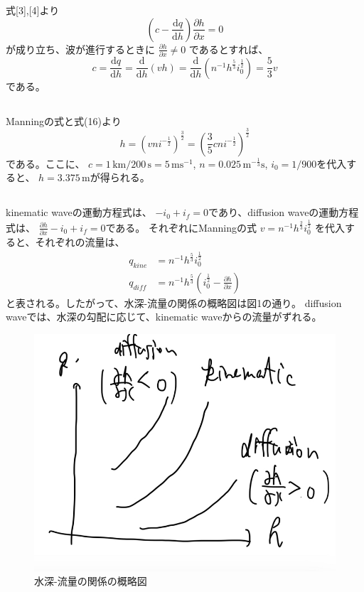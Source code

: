 \documentclass[a4paper]{jsarticle}
\begin{document}
\subsection{}
式[3],[4]より
\begin{equation}
  \left(c - \frac{\mathrm{d} q}{\mathrm{d} h}\right)
  \frac{\partial h}{\partial x} = 0
\end{equation}
が成り立ち、波が進行するときに
$\frac{\partial h}{\partial x} \neq 0$
であるとすれば、
\begin{equation}
  c = \frac{\mathrm{d} q}{\mathrm{d} h}
  = \frac{\mathrm{d}}{\mathrm{d} h} (v h)
  = \frac{\mathrm{d}}{\mathrm{d} h} \left(n^{-1} h^{\frac{5}{3}} i_0^{\frac{1}{2}}\right)
  = \frac{5}{3} v
\end{equation}
である。

\subsection{}
Manningの式と式(16)より
\begin{equation}
  h = \left(v n i^{-\frac{1}{2}}\right)^{\frac{3}{2}}
  = \left(\frac{3}{5} c n i^{-\frac{1}{2}}\right)^{\frac{3}{2}}
\end{equation}
である。ここに、
$c = 1 \, \mathrm{km} / 200 \, \mathrm{s} = 5 \,\mathrm{m s^{-1}}$,
$n = 0.025 \, \mathrm{m^{-\frac{1}{3}} s}$,
$i_0 = 1/900$を代入すると、
$h = 3.375 \, \mathrm{m}$が得られる。

\subsection{}
\subsubsection{}
kinematic waveの運動方程式は、
$-i_0 + i_f = 0$であり、diffusion waveの運動方程式は、
$\frac{\partial h}{\partial x} - i_0 + i_f = 0$である。
それぞれにManningの式
$v = n^{-1} h^{\frac{2}{3}} i_0^{\frac{1}{2}}$
を代入すると、それぞれの流量は、
\begin{align}
  q_{kine} &= n^{-1} h^{\frac{5}{3}} i_0^{\frac{1}{2}} \\
  q_{diff} &= n^{-1} h^{\frac{5}{3}} \left(i_0^{\frac{1}{2}} - \frac{\partial h}{\partial x}\right)
\end{align}
と表される。したがって、水深-流量の関係の概略図は図1の通り。
diffusion waveでは、水深の勾配に応じて、kinematic waveからの流量がずれる。
\begin{figure}[htb]
  \centering
  \includegraphics[width=0.3\hsize]{fig1.png}
  \caption{水深-流量の関係の概略図}
\end{figure}
\end{document}
